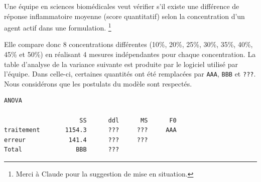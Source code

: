\begin{questions}


\pageblanche
\question Une équipe en sciences biomédicales veut vérifier s'il existe une différence de réponse inflammatoire moyenne (score quantitatif) selon la concentration d'un agent actif dans une formulation. \footnote{Merci à Claude pour la suggestion de mise en situation.}

Elle compare donc 8 concentrations différentes (10\%, 20\%, 25\%, 30\%, 35\%, 40\%, 45\% et 50\%) en réalisant 4 mesures indépendantes pour chaque concentration.
La table d'analyse de la variance suivante est produite par le logiciel utilisé par l'équipe.
Dans celle-ci, certaines quantités ont été remplacées par \texttt{AAA}, \texttt{BBB} et \texttt{???}. Nous considérons que les postulats du modèle sont respectés.

\begin{verbatim}
ANOVA

                     SS      ddl      MS      F0
traitement       1154.3      ???     ???     AAA
erreur            141.4      ???     ???
Total               BBB      ???
\end{verbatim}

\end{questions}
